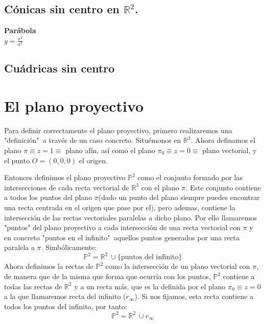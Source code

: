 \subsection{Cónicas sin centro en $\mathbb{R}^2$.}


\begin{minipage}[c]{0.45\textwidth}
  {\bf Parábola}\vspace{1em}\\
  $\displaystyle y = \frac{x^2}{a^2}$
\end{minipage}\hfill
\begin{minipage}[]{0.35\textwidth}
\end{minipage}



\subsection{Cuádricas sin centro}

\newpage

\section{El plano proyectivo}

Para definir correctamente el plano proyectivo, primero realizaremos una "definición"\ a través de un caso concreto. Situémonos en $\mathbb{R}^3$. Ahora definamos el plano $\pi \equiv z = 1 \equiv$ plano afín, así como el plano $\pi_0 \equiv z = 0 \equiv$ plano vectorial, y el punto $O = (0,0,0)$ el origen.


Entonces definimos el plano proyectivo $\mathbb{P}^2$ como el conjunto formado por las intersecciones de cada recta vectorial de $\mathbb{R}^3$ con el plano $\pi$. Este conjunto contiene a todos los puntos del plano $\pi$(dado un punto del plano siempre puedes encontrar una recta centrada en el origen que pase por el), pero ademas, contiene la intersección de las rectas vectoriales paralelas a dicho plano. Por ello llamaremos "puntos" del plano proyectivo a cada intersección de una recta vectorial con $\pi$ y en concreto "puntos en el infinito"\ aquellos puntos generados por una recta paralela a $\pi$. Simbólicamente:
$$\mathbb{P}^2 = \mathbb{R}^2\ \cup \{\text{puntos del infinito}\}$$
Ahora definimos la rectas de $\mathbb{P}^2$ como la intersección de un plano vectorial con $\pi$, de manera que de la misma que forma que ocurría con los puntos, $\mathbb{P}^2$ contiene a todas las rectas de $\mathbb{R}^2$ y a un recta más, que es la definida por el plano $\pi_0 \equiv z= 0$ a la que llamaremos recta del infinito ($r_\infty$). Si nos fijamos, esta recta contiene a todos los puntos del infinito, por tanto:
$$\mathbb{P}^2 = \mathbb{R}^2\ \cup r_\infty$$

